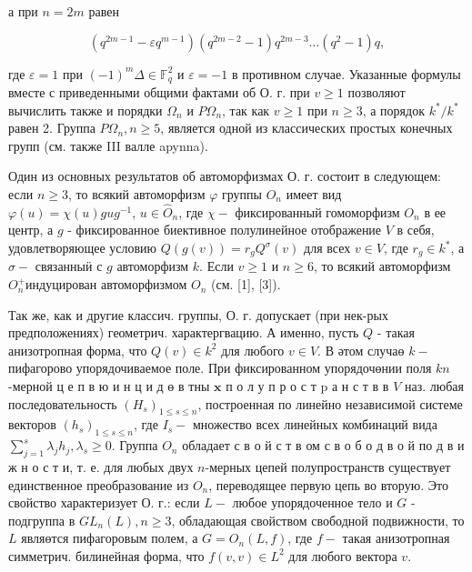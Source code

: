 \documentclass[10pt]{article}
\begin{document}
а при $n=2 m$ равен



\[

\left(q^{2 m-1}-\varepsilon q^{m-1}\right)\left(q^{2 m-2}-1\right) q^{2 m-3} \ldots\left(q^{2}-1\right) q,

\]



где $\varepsilon=1$ при $(-1)^{m} \Delta \in \mathbb{F}_{q}^{2}$ и $\varepsilon=-1$ в противном случае. Указанные формулы вместе с приведенными общими фактами об О. г. при $v \geqslant 1$ позволяют вычислить также и порядки $\Omega_{n}$ и $P \Omega_{n}$, так как $v \geqslant 1$ при $n \geqslant 3$, а порядок $k^{*} / k^{*}$ равен 2. Группа $P \Omega_{n}, n \geqslant 5$, является одной из классических простых конечных групп (см. также III валле apynna).



Один из основных результатов об автоморфизмах О. г. состоит в следующем: если $n \geqslant 3$, то всякий автоморфизм $\varphi$ группы $O_{n}$ имеет вид $\varphi(u)=\chi(u) g u g^{-1}$, $u \in \hat{O}_{n}$, где $\chi-$ фиксированный гомоморфизм $O_{n}$ в ее центр, а $g$ - фиксированное биективное полулинейное отображение $V$ в себя, удовлетворяющее условию $Q(g(v))=r_{g} Q^{\sigma}(v)$ для всех $v \in V$, где $r_{g} \in k^{*}$, а $\sigma-$ связанныӥ с $g$ автоморфизм $k$. Если $v \geqslant 1$ и $n \geqslant 6$, то всякий автоморфизм $O_{n}^{+}$индуцирован автоморфизмом $O_{n}$ (см. [1], [3]).



Так же, как и другие классич. группы, О. г. допускает (при нек-рых предположениях) геометрич. характергвацию. А именно, пусть $Q$ - такая анизотропная форма, что $Q(v) \in k^{2}$ для любого $v \in V$. В әтом случаө $k-$ пифагорово упорядочиваемое поле. При фиксированном упорядочөнии поля $k n$-мерной ц е п в ю и н ц и д ө в тны $\mathbf{x}$ п о л у п р о с т $\mathrm{p}$ а н с т в в $V$ наз. любая последовательность $\left(H_{s}\right)_{1 \leqslant s \leqslant n}$, построенная по линейно независимой системе векторов $\left(h_{s}\right)_{1 \leqslant s \leqslant n}$, где $I_{s}-$ множество всех линейных комбинаций вида $\sum_{j=1}^{s} \lambda_{j} h_{j}, \lambda_{s} \geqslant 0$. Группа $O_{n}$ обладает с в о й с т в ом с в о б о д в о й по д в и ж н о с т и, т. е. для любых двух $n$-мерных цепей полупространств существует единственное преобразование из $O_{n}$, переводящее первую цепь во вторую. Это свойство характеризует О. г.: если $L-$ любое упорядоченное тело и $G$ - подгруппа в $G L_{n}(L), n \geqslant 3$, обладающая свойством свободной подвижности, то $L$ являөтся пифагоровым полем, а $G=O_{n}(L, f)$, где $f-$ такая анизотропная симметрич. билинейная форма, что $f(v, v) \in L^{2}$ для любого вектора $v$.
\end{document}
